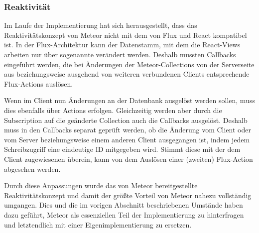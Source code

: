 \subsubsection{Reaktivität}
\label{sssec:elf_reaktivität}

Im Laufe der Implementierung hat sich herausgestellt, dass das
Reaktivitätskonzept von Meteor nicht mit dem von Flux und React kompatibel ist.
In der Flux-Architektur kann der Datenstamm, mit dem die React-Views arbeiten
nur über sogenannte  verändert werden.  Deshalb mussten
Callbacks eingeführt werden, die bei Änderungen der Meteor-Collections von der
Serverseite aus beziehungsweise ausgehend von weiteren verbundenen Clients
entsprechende Flux-Actions auslösen.

Wenn im Client nun Änderungen an der Datenbank ausgelöst werden sollen, muss
dies ebenfalls über Actions erfolgen.  Gleichzeitig werden aber durch die
Subscription auf die geänderte Collection auch die Callbacks ausgelöst.  Deshalb
muss in den Callbacks separat geprüft werden, ob die Änderung vom Client oder
vom Server beziehungsweise einem anderen Client ausgegangen ist, indem jedem
Schreibzugriff eine eindeutige ID mitgegeben wird.  Stimmt diese mit der dem
Client zugewiesenen überein, kann von dem Auslösen einer (zweiten) Flux-Action
abgesehen werden.

Durch diese Anpassungen wurde das von Meteor bereitgestellte Reaktivitätskonzept
und damit der größte Vorteil von Meteor nahezu vollständig umgangen.  Dies und
die im vorigen Abschnitt beschriebenen Umstände haben dazu geführt, Meteor als
essenziellen Teil der Implementierung zu hinterfragen und letztendlich
mit einer Eigenimplementierung zu ersetzen.
